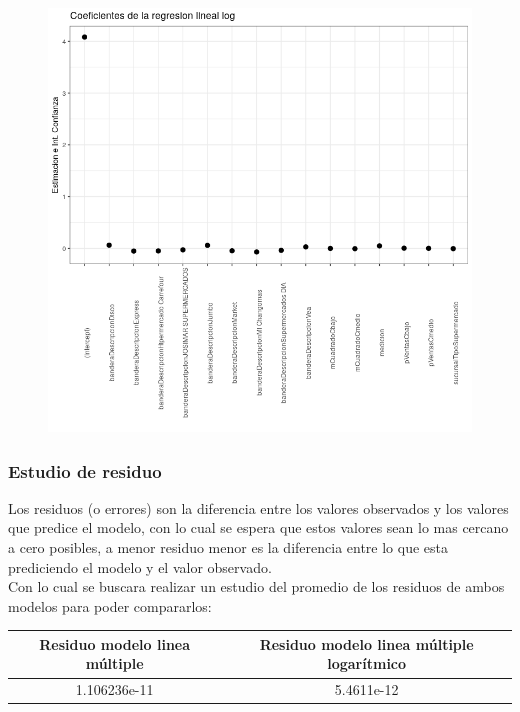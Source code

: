 \begin{figure}[H]
{\includegraphics[width=0.4\paperwidth, height=0.4\paperheight, keepaspectratio]{img/ln_complog_coef.png}
}
\end{figure}




\subsubsection{Estudio de residuo}

Los residuos (o errores) son la diferencia entre los valores observados y los valores que predice el modelo, con lo cual se espera que estos valores sean lo mas cercano a cero posibles, a menor residuo menor es la diferencia entre lo que esta prediciendo el modelo y el valor observado.\\
Con lo cual se buscara realizar un estudio del promedio de los residuos de ambos modelos para poder compararlos:\\



\begin{center}
 \begin{tabular}{||c c||} 
 \hline
    Residuo modelo linea múltiple & Residuo modelo linea múltiple logarítmico \\ 
 \hline
 1.106236e-11 & 5.4611e-12 \\
 \hline
 \hline
\end{tabular}
\end{center}

